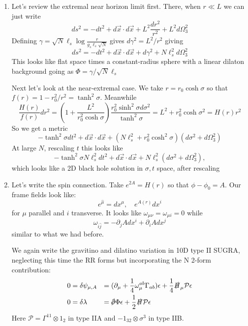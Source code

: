 \documentclass[11pt, class=article, crop=false]{standalone}
\begin{document}
\begin{enumerate}
	\item Let's review the extremal near horizon limit first. There, when $r \ll L$ we can just write
	\[
		ds^2 = -dt^2 + d\vec x \cdot d\vec x + L^2 \frac{dr^2}{r^2} + L^2 d \Omega^2_3
	\]
	Defining $\gamma=  \sqrt{N} \ell_s \log\frac{r}{g_s \ell_s \sqrt N}$ gives $d \gamma^2 = L^2/r^2$ giving 
	\[
		ds^2 = - dt^2 +  d\vec x \cdot d\vec x + d\gamma^2 + N \ell_s^2 d \Omega^2_3
	\]
	This looks like flat space times a constant-radius sphere with a linear dilaton background going as $\Phi = \gamma/\sqrt{N} \ell_s$
	
	Next let's look at the near-extremal case. We take $r = r_0 \cosh \sigma$ so that $f(r) = 1 - r_0^2/r^2 = \tanh^{2} \sigma$. Meanwhile 
	\[
		\frac{H(r)}{f(r)} dr^2 = (1 + \frac{L^2}{r_0^2 \cosh \sigma}) \frac{r_0^2 \sinh^2 \sigma d\sigma^2}{\tanh^2 \sigma} = L^2 + r_0^2 \cosh \sigma^2 = H(r) r^2
	\]
	So we get a metric
	\[
		-\tanh^2 \sigma dt^2 +  d\vec x \cdot d\vec x + (N \ell_s^2 + r_0^2 \cosh^2 \sigma) (d\sigma^2 + d\Omega^2_3)
	\]
	At large $N$, rescaling $t$ this looks like
	\[
		-\tanh^2 \sigma N \ell_s^2 dt^2 +  d\vec x \cdot d\vec x + N \ell_s^2 (d\sigma^2 + d\Omega^2_3),
	\]
	which looks like a 2D black hole solution in $\sigma, t$ space, after rescaling 
	
	\item Let's write the spin connection. Take $e^{2A} = H(r)$ so that $\phi - \phi_0 = A$. Our frame fields look like:
	\[
		e^{\hat \mu} = dx^\mu, \quad e^{A(r)} dx^i
	\]
	for $\mu$ parallel and $i$ transverse. It looks like $\omega_{\mu \nu} = \omega_{\mu i} = 0$ while 
	\[
		\omega_{\hat i \hat j} = - \partial_j A dx^i + \partial_i A dx^j
	\]
	similar to what we had before.
	
	We again write the gravitino and dilatino variation in 10D type II SUGRA, neglecting this time the RR forms but incorporating the N 2-form contribution: 
	\[
	\begin{aligned}
		0 &=
		 \delta \psi_{\mu, A} & = & \; (\d_\mu + \frac14 \omega_{\mu}^{ab} \Gamma_{ab}) \epsilon + \frac14 \slashed{H}_\mu \mathcal P \epsilon \\
		0 &= \delta \lambda & =& \; \slashed{\d} \Phi \epsilon  + \frac12 \slashed{H} \mathcal P \epsilon
	\end{aligned}
	\]
	Here $\mathcal P  = \Gamma^{11} \otimes 1_2$ in type IIA and $-1_{32} \otimes \sigma^{3}$ in type IIB. 
	

\end{enumerate}
\end{document}

